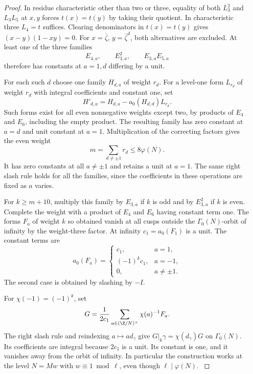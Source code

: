 \begin{proof}
In residue characteristic other than two or three, equality of
both \(L_3^2\) and \(L_3L_5\) at \(x,y\) forces
\(t(x)=t(y)\) by taking their quotient.
In characteristic three \(L_4=t\) suffices. Clearing denominators
in \(t(x)=t(y)\) gives \((x-y)(1-xy)=0\).
For \(x=\bar\zeta\), \(y=\bar\zeta^d\), both alternatives
are excluded. At least one of the three families
\[
      E_{4,a},\qquad E_{3,a}^2,\qquad E_{3,a}E_{5,a}
\]
therefore has constants at \(a=1,d\) differing by a unit.

For each such \(d\) choose one family \(H_{d,a}\) of weight \(r_d\).
For a level-one form \(L_{r_d}\) of weight \(r_d\)
with integral coefficients and constant one, set
\[
        H'_{d,a}=H_{d,a}-a_0(H_{d,d})L_{r_d}.
\] Such
forms exist for all even nonnegative weights except two,
by products of \(E_4\) and \(E_6\), including the empty product.
The resulting family has zero constant at \(a=d\) and unit
constant at \(a=1\). Multiplication of the correcting factors gives the even weight
\begin{equation}\label{eq:count-three-correction-degree}
                 m=\sum_{d\ne\pm1}r_d\le8\varphi(N).
\end{equation}
It has zero constants at all \(a\ne\pm1\) and retains a
unit at \(a=1\). The same right slash rule holds for all the
families, since the coefficients in these operations are fixed
as \(a\) varies.

For \(k\geq m+10\), multiply this family by \(E_{3,a}\) if
\(k\) is odd and by \(E_{3,a}^2\) if \(k\) is even. Complete the weight with a product of \(E_4\) and \(E_6\) having constant term one.
The forms \(F_a\) of weight \(k\) so obtained vanish at all
cusps outside the \(\Gamma_0(N)\)-orbit of infinity by the
weight-three factor. At infinity \(c_1=a_0(F_1)\) is a unit. The constant terms
are
\[
       a_0(F_a)=
       \begin{cases}
       c_1,&a=1,\\
       (-1)^kc_1,&a=-1,\\
       0,&a\ne\pm1 .
       \end{cases}
\]
The second case is obtained by slashing by \(-I\).

For \(\chi(-1)=(-1)^k\), set
\[
    G=\frac{1}{2c_1}\sum_{a\in(\Z/N)^\times}\chi(a)^{-1}F_a .
\]
The right slash rule and reindexing \(a\mapsto ad_\gamma\)
give \(G|_k\gamma=\chi(d_\gamma)G\) on \(\Gamma_0(N)\).
Its coefficients are integral because \(2c_1\) is a unit.
Its constant is one, and it vanishes away from the orbit of
infinity. In particular the construction works at the level
\(N=Mw\) with \(w\equiv1\bmod\ell\), even though
\(\ell\mid\varphi(N)\).
\label{cor:ordinary-count-iii-eigenform-1}

\end{proof}

